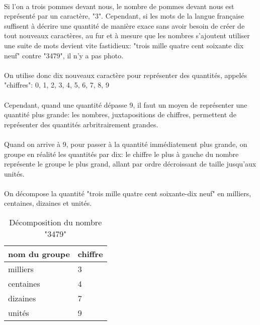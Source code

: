 \documentclass[a4paper]{book}
\begin{document}
    \paragraph{}
    Si l'on a trois pommes devant nous, le nombre de pommes devant nous est représenté par un caractère, "3". Cependant, si les mots de la langue française suffisent à décrire une quantité de manière exace sans avoir besoin de créer de tout nouveaux caractères, au fur et à mesure que les nombres s'ajoutent utiliser une suite de mots devient vite fastidieux: "trois mille quatre cent soixante dix neuf" contre "3479", il n'y a pas photo.%
    \paragraph{}
    On utilise donc dix nouveaux caractère pour représenter des quantités, appelés "chiffres": 0, 1, 2, 3, 4, 5, 6, 7, 8, 9
    \paragraph{}
    Cependant, quand une quantité dépasse 9, il faut un moyen de représenter une quantité plus grande: les nombres, juxtapositions de chiffres, permettent de représenter des quantités arbritrairement grandes.
    \paragraph{}
    Quand on arrive à 9, pour passer à la quantité immédiatement plus grande, on groupe en réalité les quantités par dix: le chiffre le plus à gauche du nombre représente le groupe le plus grand, allant par ordre décroissant de taille jusqu'aux unités.
    \paragraph{}
    On décompose la quantité "trois mille quatre cent soixante-dix neuf" en milliers, centaines, dizaines et unités.
    \begin{table}[h]
        \centering
        \begin{tabular}{l|l}
            nom du groupe & chiffre\\\hline
            milliers & 3 \\
            centaines & 4 \\
            dizaines & 7\\
            unités & 9\\
        \end{tabular}
        \caption{Décomposition du nombre "3479"}
        \label{tab:number_decomposition}
    \end{table}
    
\end{document}
